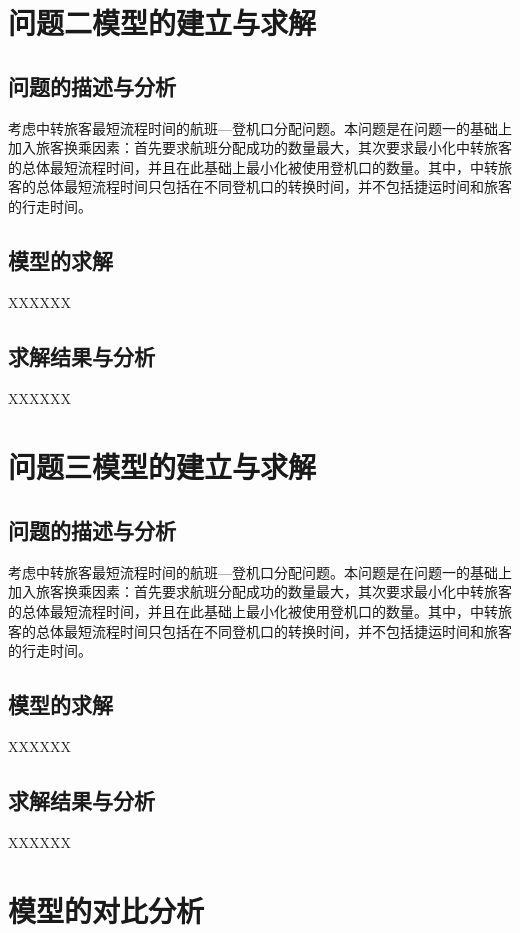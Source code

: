 \documentclass[bwprint]{gmcmthesis}
\numberwithin{figure}{section}
\begin{document}
\section{问题二模型的建立与求解}
\subsection{问题的描述与分析}
考虑中转旅客最短流程时间的航班—登机口分配问题。本问题是在问题一的基础上加入旅客换乘因素：首先要求航班分配成功的数量最大，其次要求最小化中转旅客的总体最短流程时间，并且在此基础上最小化被使用登机口的数量。其中，中转旅客的总体最短流程时间只包括在不同登机口的转换时间，并不包括捷运时间和旅客的行走时间。
\subsection{模型的求解}     \par  XXXXXX 
\subsection{求解结果与分析} \par  XXXXXX

\section{问题三模型的建立与求解}
\subsection{问题的描述与分析}
考虑中转旅客最短流程时间的航班—登机口分配问题。本问题是在问题一的基础上加入旅客换乘因素：首先要求航班分配成功的数量最大，其次要求最小化中转旅客的总体最短流程时间，并且在此基础上最小化被使用登机口的数量。其中，中转旅客的总体最短流程时间只包括在不同登机口的转换时间，并不包括捷运时间和旅客的行走时间。
\subsection{模型的求解}     \par  XXXXXX 
\subsection{求解结果与分析} \par  XXXXXX

\section{模型的对比分析}
\end{document}
